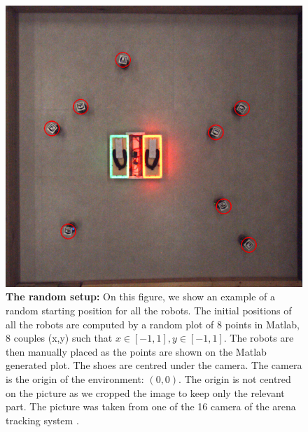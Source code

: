 \documentclass[oneside, a4paper, 12pt]{memoir}
\let\oldCaption\caption
\renewcommand{\caption}[2]{
\oldCaption[#1]{{\small\sffamily\bfseries #1:} #2}
}
\begin{document}
				\begin{figure}[!htp]
					\includegraphics[width=\textwidth]{images/setup_random.png}
					\caption{The random setup}{On this figure, we show an example of a random starting position for all the robots. The initial positions of all the robots are computed by a random plot of 8 points in Matlab, 8 couples (x,y) such that $x \in [-1,1], y \in [-1,1]$. The robots are then manually placed as the points are shown on the Matlab generated plot. The shoes are centred under the camera. The camera is the origin of the environment: $(0,0)$. The origin is not centred on the picture as we cropped the image to keep only the relevant part. The picture was taken from one of the 16 camera of the arena tracking system \citep{stranieri2013iridia}.}
					\label{fig:random_setup}
				\end{figure}
			
\end{document}
